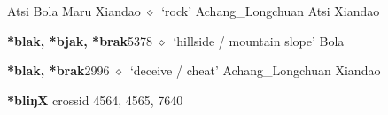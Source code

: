 \begin{list}{}{\leftmargin=1.5em \itemindent=-1.5em}
         Atsi 
\hspace{1ex}
         Bola 
\hspace{1ex}
         Maru 
\hspace{1ex}
         Xiandao 
\hspace{1ex}
         $\diamond$~`rock'
         Achang\_Longchuan 
\hspace{1ex}
         Atsi 
\hspace{1ex}
         Xiandao 
  \item {\footnotesize \textbf{*blak, *bjak, *brak}}{\tiny 5378}
\hspace{1ex}
         $\diamond$~`hillside / mountain slope'
         Bola 
  \item {\footnotesize \textbf{*blak, *brak}}{\tiny 2996}
\hspace{1ex}
         $\diamond$~`deceive / cheat'
         Achang\_Longchuan 
\hspace{1ex}
         Xiandao 
  \end{list}
\item
\textbf{*bliŋX}
  {\tiny crossid 4564, 4565, 7640}
